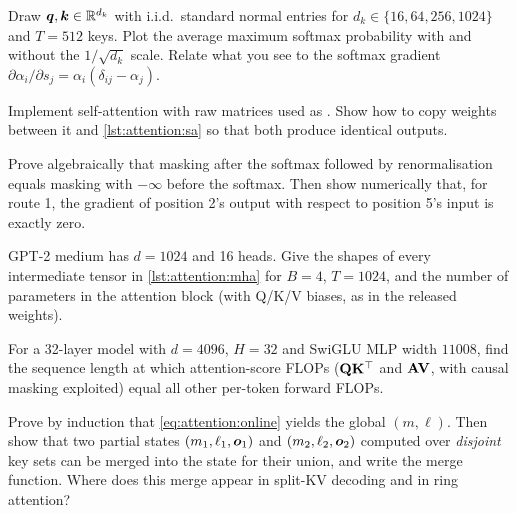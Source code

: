 \begin{exercise}[scaling]
Draw $\bm{q},\bm{k}\in\mathbb{R}^{d_k}$ with i.i.d.\ standard normal entries for $d_k\in\{16,64,256,1024\}$
and $T=512$ keys. Plot the average maximum softmax probability with and without the
$1/\sqrt{d_k}$ scale. Relate what you see to the softmax gradient
$\partial\alpha_i/\partial s_j=\alpha_i(\delta_{ij}-\alpha_j)$.
\end{exercise}

\begin{exercise}
Implement self-attention with raw  matrices used as . Show how to
copy weights between it and \cref{lst:attention:sa} so that both produce identical outputs.
\end{exercise}

\begin{exercise}[no leakage]
Prove algebraically that masking after the softmax followed by renormalisation equals masking with
$-\infty$ before the softmax. Then show numerically that, for route 1, the gradient of position 2's
output with respect to position 5's input is exactly zero.
\end{exercise}

\begin{exercise}
GPT-2 medium has $d=1024$ and 16 heads. Give the shapes of every intermediate tensor in
\cref{lst:attention:mha} for $B=4$, $T=1024$, and the number of parameters in the attention block
(with Q/K/V biases, as in the released weights).
\end{exercise}

\begin{exercise}
For a 32-layer model with $d=4096$, $H=32$ and SwiGLU MLP width $11008$, find the sequence length at
which attention-score FLOPs ($\mathbf{Q}\mathbf{K}^\top$ and $\mathbf{A}\mathbf{V}$, with causal masking exploited)
equal all other per-token forward FLOPs.
\end{exercise}

\begin{exercise}
Prove by induction that \cref{eq:attention:online} yields the global $(m,\ell)$. Then show that two
partial states $(m_1,\ell_1,\bm{o}_1)$ and $(m_2,\ell_2,\bm{o}_2)$ computed over \emph{disjoint}
key sets can be merged into the state for their union, and write the merge function. Where does this
merge appear in split-KV decoding and in ring attention?
\end{exercise}

